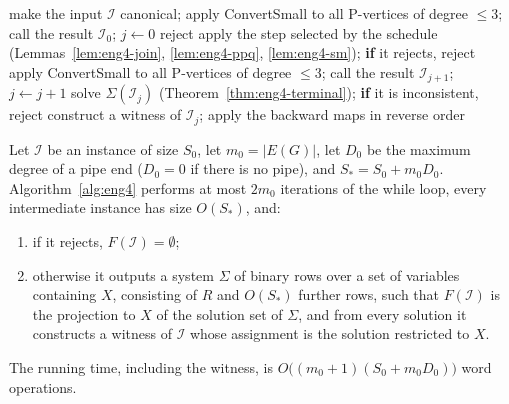 \begin{algorithm}[t]
\caption{The local-gap engine}\label{alg:eng4}
\begin{algorithmic}[1]
\State make the input $\mathcal I$ canonical; apply ConvertSmall to all P-vertices of
  degree $\le3$; call the result $\mathcal I_0$; $j\gets0$
   \Return reject \EndIf
  \State apply the step selected by the schedule
  (Lemmas~\ref{lem:eng4-join}, \ref{lem:eng4-ppq}, \ref{lem:eng4-sm});
  \textbf{if} it rejects, \Return reject
  \State apply ConvertSmall to all P-vertices of degree $\le3$; call the
  result $\mathcal I_{j+1}$; $j\gets j+1$
\EndWhile
\State solve $\Sigma(\mathcal I_j)$ (Theorem~\ref{thm:eng4-terminal});
  \textbf{if} it is inconsistent, \Return reject
\State construct a witness of $\mathcal I_j$; apply the backward maps in
  reverse order
\end{algorithmic}
\end{algorithm}

\begin{theorem}[engine]\label{thm:eng4-main}
Let $\mathcal I$ be an instance of size $S_0$, let $m_0=|E(G)|$, let $D_0$ be
the maximum degree of a pipe end ($D_0=0$ if there is no pipe), and
$S_\ast=S_0+m_0D_0$. Algorithm~\ref{alg:eng4} performs at most $2m_0$
iterations of the while loop, every intermediate instance has size
$O(S_\ast)$, and:
\begin{enumerate}[label=(\alph*),nosep]
\item if it rejects, $F(\mathcal I)=\emptyset$;
\item otherwise it outputs a system $\Sigma$ of binary rows over a set of
  variables containing $X$, consisting of $R$ and $O(S_\ast)$ further rows,
  such that $F(\mathcal I)$ is the projection to $X$ of the solution set of
  $\Sigma$, and from every solution it constructs a witness of $\mathcal I$
  whose assignment is the solution restricted to $X$.
\end{enumerate}
The running time, including the witness, is
$O\bigl((m_0+1)(S_0+m_0D_0)\bigr)$ word operations.
\end{theorem}

